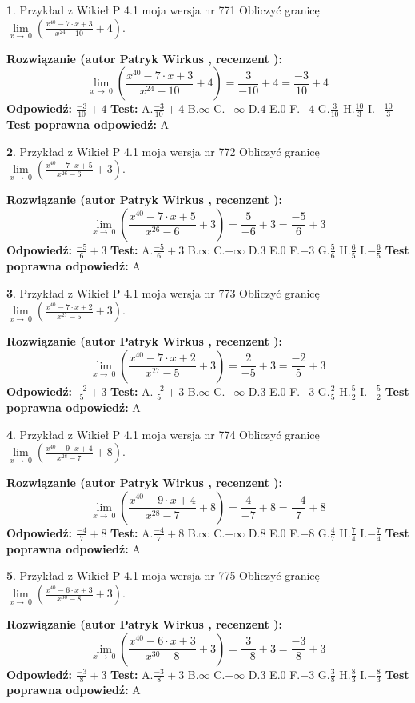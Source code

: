 \documentclass[12pt, a4paper]{article}
\theoremstyle{definition} %
\newtheorem{zad}{}
\newcommand{\zadStart}[1]{\begin{zad}#1\newline}
\newcommand{\zadStop}{\end{zad}}
\newcommand{\rozwStart}[2]{\noindent \textbf{Rozwiązanie (autor #1 , recenzent #2): }\newline}
\newcommand{\rozwStop}{\newline}
\newcommand{\odpStart}{\noindent \textbf{Odpowiedź:}\newline}
\newcommand{\odpStop}{\newline}
\newcommand{\testStart}{\noindent \textbf{Test:}\newline}
\newcommand{\testStop}{\newline}
\newcommand{\kluczStart}{\noindent \textbf{Test poprawna odpowiedź:}\newline}
\newcommand{\kluczStop}{\newline}
\begin{document}
\zadStart{Przykład z Wikieł P 4.1 moja wersja nr 771}
Obliczyć granicę $\lim\limits_{x\to\ 0}(\frac{x^{40}-7 \cdot x +3}{x^{24}-10}+4)$.
\zadStop
\rozwStart{Patryk Wirkus}{}
$$\lim\limits_{x\to\ 0}(\frac{x^{40}-7 \cdot x +3}{x^{24}-10}+4)=\frac{3}{-10}+4=\frac{-3}{10}+4$$
\rozwStop
\odpStart
$\frac{-3}{10}+4$
\odpStop
\testStart
A.$\frac{-3}{10}+4$
B.$\infty$
C.$-\infty$
D.$4$
E.$0$
F.$-4$
G.$\frac{3}{10}$
H.$\frac{10}{3}$
I.$-\frac{10}{3}$
\testStop
\kluczStart
A
\kluczStop



\zadStart{Przykład z Wikieł P 4.1 moja wersja nr 772}
Obliczyć granicę $\lim\limits_{x\to\ 0}(\frac{x^{40}-7 \cdot x +5}{x^{26}-6}+3)$.
\zadStop
\rozwStart{Patryk Wirkus}{}
$$\lim\limits_{x\to\ 0}(\frac{x^{40}-7 \cdot x +5}{x^{26}-6}+3)=\frac{5}{-6}+3=\frac{-5}{6}+3$$
\rozwStop
\odpStart
$\frac{-5}{6}+3$
\odpStop
\testStart
A.$\frac{-5}{6}+3$
B.$\infty$
C.$-\infty$
D.$3$
E.$0$
F.$-3$
G.$\frac{5}{6}$
H.$\frac{6}{5}$
I.$-\frac{6}{5}$
\testStop
\kluczStart
A
\kluczStop



\zadStart{Przykład z Wikieł P 4.1 moja wersja nr 773}
Obliczyć granicę $\lim\limits_{x\to\ 0}(\frac{x^{40}-7 \cdot x +2}{x^{27}-5}+3)$.
\zadStop
\rozwStart{Patryk Wirkus}{}
$$\lim\limits_{x\to\ 0}(\frac{x^{40}-7 \cdot x +2}{x^{27}-5}+3)=\frac{2}{-5}+3=\frac{-2}{5}+3$$
\rozwStop
\odpStart
$\frac{-2}{5}+3$
\odpStop
\testStart
A.$\frac{-2}{5}+3$
B.$\infty$
C.$-\infty$
D.$3$
E.$0$
F.$-3$
G.$\frac{2}{5}$
H.$\frac{5}{2}$
I.$-\frac{5}{2}$
\testStop
\kluczStart
A
\kluczStop



\zadStart{Przykład z Wikieł P 4.1 moja wersja nr 774}
Obliczyć granicę $\lim\limits_{x\to\ 0}(\frac{x^{40}-9 \cdot x +4}{x^{28}-7}+8)$.
\zadStop
\rozwStart{Patryk Wirkus}{}
$$\lim\limits_{x\to\ 0}(\frac{x^{40}-9 \cdot x +4}{x^{28}-7}+8)=\frac{4}{-7}+8=\frac{-4}{7}+8$$
\rozwStop
\odpStart
$\frac{-4}{7}+8$
\odpStop
\testStart
A.$\frac{-4}{7}+8$
B.$\infty$
C.$-\infty$
D.$8$
E.$0$
F.$-8$
G.$\frac{4}{7}$
H.$\frac{7}{4}$
I.$-\frac{7}{4}$
\testStop
\kluczStart
A
\kluczStop



\zadStart{Przykład z Wikieł P 4.1 moja wersja nr 775}
Obliczyć granicę $\lim\limits_{x\to\ 0}(\frac{x^{40}-6 \cdot x +3}{x^{30}-8}+3)$.
\zadStop
\rozwStart{Patryk Wirkus}{}
$$\lim\limits_{x\to\ 0}(\frac{x^{40}-6 \cdot x +3}{x^{30}-8}+3)=\frac{3}{-8}+3=\frac{-3}{8}+3$$
\rozwStop
\odpStart
$\frac{-3}{8}+3$
\odpStop
\testStart
A.$\frac{-3}{8}+3$
B.$\infty$
C.$-\infty$
D.$3$
E.$0$
F.$-3$
G.$\frac{3}{8}$
H.$\frac{8}{3}$
I.$-\frac{8}{3}$
\testStop
\kluczStart
A
\kluczStop
\end{document}
